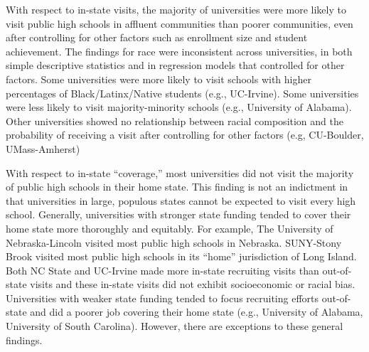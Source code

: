 \documentclass[twoside]{article}
\begin{document}
With respect to in-state visits, the majority of universities were more likely to visit public high schools in affluent communities than poorer communities, even after controlling for other factors such as enrollment size and student achievement. The findings for race were inconsistent across universities, in both simple descriptive statistics and in regression models that controlled for other factors. Some universities were more likely to visit schools with higher percentages of Black/Latinx/Native students (e.g., UC-Irvine). Some universities were less likely to visit majority-minority schools (e.g., University of Alabama). Other universities showed no relationship between racial composition and the probability of receiving a visit after controlling for other factors (e.g, CU-Boulder, UMass-Amherst)

With respect to in-state ``coverage,'' most universities did not visit the majority of public high schools in their home state.  This finding is not an indictment in that universities in large, populous states cannot be expected to visit every high school. Generally, universities with stronger state funding tended to cover their home state more thoroughly and equitably. For example, The University of Nebraska-Lincoln visited most public high schools in Nebraska. SUNY-Stony Brook visited most public high schools in its ``home'' jurisdiction of Long Island. Both NC State and UC-Irvine made more in-state recruiting visits than out-of-state visits and these in-state visits did not exhibit socioeconomic or racial bias. Universities with weaker state funding tended to focus recruiting efforts out-of-state and did a poorer job covering their home state (e.g., University of Alabama, University of South Carolina). However, there are exceptions to these general findings.
\end{document}
